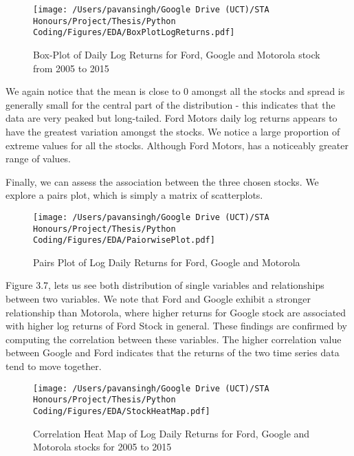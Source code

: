 \begin{figure}[h]
\centering
  \texttt{[image: /Users/pavansingh/Google Drive (UCT)/STA Honours/Project/Thesis/Python Coding/Figures/EDA/BoxPlotLogReturns.pdf]}
  \caption{Box-Plot of Daily Log Returns for Ford, Google and Motorola stock from 2005 to 2015}
  \label{}
\end{figure}

We again notice that the mean is close to 0 amongst all the stocks and spread is generally small for the central part of the distribution - this indicates that the data are very peaked but long-tailed. Ford Motors daily log returns appears to have the greatest variation amongst the stocks.  We notice a large proportion of extreme values for all the stocks. Although Ford Motors, has a noticeably greater range of values. 

Finally, we can assess the association between the three chosen stocks. We explore a pairs plot, which is simply a matrix of scatterplots.

\begin{figure}[h]
\centering
  \texttt{[image: /Users/pavansingh/Google Drive (UCT)/STA Honours/Project/Thesis/Python Coding/Figures/EDA/PaiorwisePlot.pdf]}
  \caption{Pairs Plot of Log Daily Returns for Ford, Google and Motorola}
  \label{}
\end{figure}

Figure 3.7, lets us see both distribution of single variables and relationships between two variables. We note that Ford and Google exhibit a stronger relationship than Motorola, where higher returns for Google stock are associated with higher log returns of Ford Stock in general. These findings are confirmed by computing the correlation between these variables. The higher correlation value between Google and Ford indicates that the returns of the two time series data tend to move together.

\begin{figure}[h]
\centering
  \texttt{[image: /Users/pavansingh/Google Drive (UCT)/STA Honours/Project/Thesis/Python Coding/Figures/EDA/StockHeatMap.pdf]}
  \caption{Correlation Heat Map of Log Daily Returns for Ford, Google and Motorola stocks for 2005 to 2015}
  \label{}
\end{figure}




